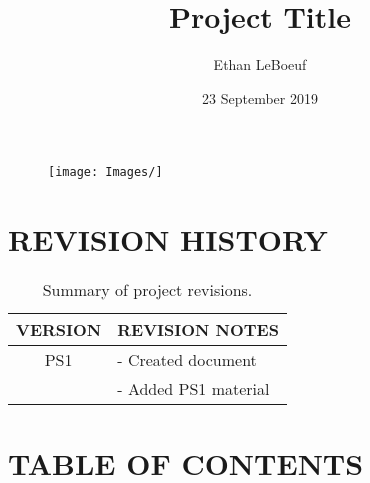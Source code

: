 \documentclass[12pt,a4paper,notitlepage]{article}
\begin{document}
\title{\Huge \textbf{Project Title}}
\author{\Large Ethan LeBoeuf}
\date{\Large 23 September 2019}

\begin{minipage}[h]{\textwidth}
	\vspace{4 cm}
	\advance\leftskip-1in
    \maketitle
\end{minipage}

\begin{figure}[H]
\centering
\texttt{[image: Images/]}
\end{figure}

\pagebreak

\section*{\Large REVISION HISTORY}

\begin{table}[h!]
\begin{center}
\begin{tabular} [0.9 \textwidth]{cl}
\hline \hline
\multicolumn{1}{c}{VERSION} & \multicolumn{1}{l}{REVISION NOTES} \\
\hline
PS1 & - Created document \\
    & - Added PS1 material \\
\hline \hline
\end{tabular}
	\caption{Summary of project revisions.}
\end{center}
\end{table}
 
\newpage
\section*{\Large TABLE OF CONTENTS}
\makeatletter
{}
\makeatother
\newpage
\end{document}

